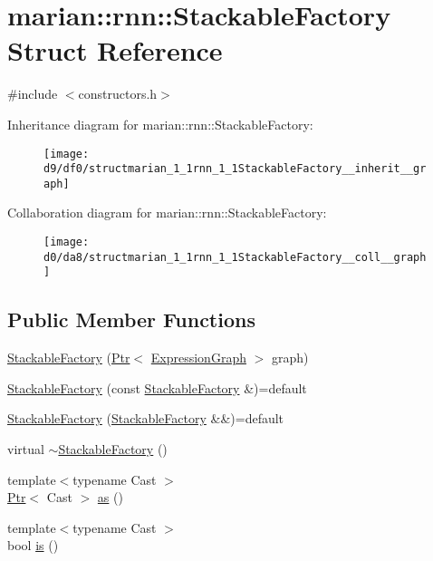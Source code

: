 \hypertarget{structmarian_1_1rnn_1_1StackableFactory}{}\section{marian\+:\+:rnn\+:\+:Stackable\+Factory Struct Reference}
\label{structmarian_1_1rnn_1_1StackableFactory}


{\ttfamily \#include $<$constructors.\+h$>$}



Inheritance diagram for marian\+:\+:rnn\+:\+:Stackable\+Factory\+:
\nopagebreak
\begin{figure}[H]
\begin{center}
\leavevmode
\texttt{[image: d9/df0/structmarian\_1\_1rnn\_1\_1StackableFactory\_\_inherit\_\_graph]}
\end{center}
\end{figure}


Collaboration diagram for marian\+:\+:rnn\+:\+:Stackable\+Factory\+:
\nopagebreak
\begin{figure}[H]
\begin{center}
\leavevmode
\texttt{[image: d0/da8/structmarian\_1\_1rnn\_1\_1StackableFactory\_\_coll\_\_graph]}
\end{center}
\end{figure}
\subsection*{Public Member Functions}
\begin{DoxyCompactItemize}
\item 
\hyperlink{structmarian_1_1rnn_1_1StackableFactory_a8d89897e89e02ea87c725a63bb8e3bd0}{Stackable\+Factory} (\hyperlink{namespacemarian_ad1a373be43a00ef9ce35666145137b08}{Ptr}$<$ \hyperlink{classmarian_1_1ExpressionGraph}{Expression\+Graph} $>$ graph)
\item 
\hyperlink{structmarian_1_1rnn_1_1StackableFactory_a64f3bd14a015299c3f69ceb7c55cc968}{Stackable\+Factory} (const \hyperlink{structmarian_1_1rnn_1_1StackableFactory}{Stackable\+Factory} \&)=default
\item 
\hyperlink{structmarian_1_1rnn_1_1StackableFactory_a147ead23b692d792c73a8d23a60a9616}{Stackable\+Factory} (\hyperlink{structmarian_1_1rnn_1_1StackableFactory}{Stackable\+Factory} \&\&)=default
\item 
virtual \hyperlink{structmarian_1_1rnn_1_1StackableFactory_aab16e813fc068d8bc139065b448d53d6}{$\sim$\+Stackable\+Factory} ()
\item 
{\footnotesize template$<$typename Cast $>$ }\\\hyperlink{namespacemarian_ad1a373be43a00ef9ce35666145137b08}{Ptr}$<$ Cast $>$ \hyperlink{structmarian_1_1rnn_1_1StackableFactory_aa0d1b7976911c502c498baa17d02282a}{as} ()
\item 
{\footnotesize template$<$typename Cast $>$ }\\bool \hyperlink{structmarian_1_1rnn_1_1StackableFactory_a0cc371e4ed326a31006658140f9a9f51}{is} ()
\end{DoxyCompactItemize}
